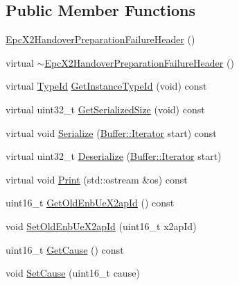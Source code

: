 \subsection*{Public Member Functions}
\begin{DoxyCompactItemize}
\item 
\hyperlink{classns3_1_1EpcX2HandoverPreparationFailureHeader_a657a9120718c9eb446c73c123ec6e678}{Epc\+X2\+Handover\+Preparation\+Failure\+Header} ()
\item 
virtual \hyperlink{classns3_1_1EpcX2HandoverPreparationFailureHeader_a4f0aa66d234ab9460d4ec5f8a404cd7a}{$\sim$\+Epc\+X2\+Handover\+Preparation\+Failure\+Header} ()
\item 
virtual \hyperlink{classns3_1_1TypeId}{Type\+Id} \hyperlink{classns3_1_1EpcX2HandoverPreparationFailureHeader_a10d80074354979b14a4dc9ee0625a1af}{Get\+Instance\+Type\+Id} (void) const 
\item 
virtual uint32\+\_\+t \hyperlink{classns3_1_1EpcX2HandoverPreparationFailureHeader_a2d3a6f751d6a486bdf9e72842d322cc4}{Get\+Serialized\+Size} (void) const 
\item 
virtual void \hyperlink{classns3_1_1EpcX2HandoverPreparationFailureHeader_ab14ddb08e23e2b3d58f4375c60ef2059}{Serialize} (\hyperlink{classns3_1_1Buffer_1_1Iterator}{Buffer\+::\+Iterator} start) const 
\item 
virtual uint32\+\_\+t \hyperlink{classns3_1_1EpcX2HandoverPreparationFailureHeader_ad92fd70a3a5292d19e6df4c30bca0826}{Deserialize} (\hyperlink{classns3_1_1Buffer_1_1Iterator}{Buffer\+::\+Iterator} start)
\item 
virtual void \hyperlink{classns3_1_1EpcX2HandoverPreparationFailureHeader_aa85c463602ce9c40bdbd171e43c2a68a}{Print} (std\+::ostream \&os) const 
\item 
uint16\+\_\+t \hyperlink{classns3_1_1EpcX2HandoverPreparationFailureHeader_a09c701493b15d6ab8908999b82821501}{Get\+Old\+Enb\+Ue\+X2ap\+Id} () const 
\item 
void \hyperlink{classns3_1_1EpcX2HandoverPreparationFailureHeader_ab5f7bbfa8ec2c0b694339eb9666f3032}{Set\+Old\+Enb\+Ue\+X2ap\+Id} (uint16\+\_\+t x2ap\+Id)
\item 
uint16\+\_\+t \hyperlink{classns3_1_1EpcX2HandoverPreparationFailureHeader_aec1ad772fbd5ec7cb1a0031e32350b07}{Get\+Cause} () const 
\item 
void \hyperlink{classns3_1_1EpcX2HandoverPreparationFailureHeader_a26901b36f25786a8b748aba7548e2592}{Set\+Cause} (uint16\+\_\+t cause)
\item 

\end{DoxyCompactItemize}
